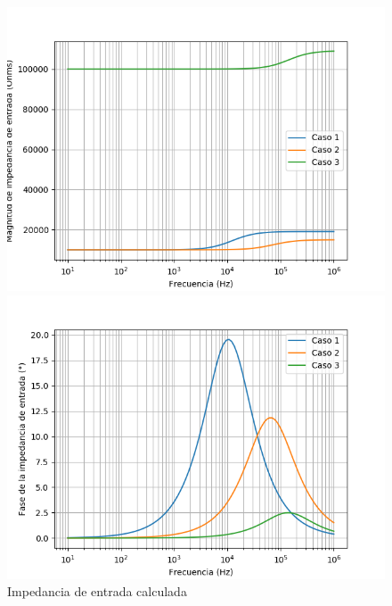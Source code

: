 \begin{figure}[H]
\begin{centering}
\includegraphics[scale=0.5]{../Ex1/iA/Resources1a/zinpm}
\par\end{centering}
\begin{centering}
\includegraphics[scale=0.5]{../Ex1/iA/Resources1a/zinpp}
\par\end{centering}
\caption{Impedancia de entrada calculada}
\label{1_a_3}

\end{figure}

